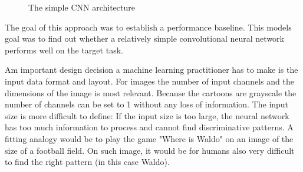 \documentclass[draft,final,oneside]{vutinfth} %
\begin{document}
\begin{figure}[ht]

	
	\caption{The simple CNN architecture}
	\label{fig:simplecnn}
\end{figure}

The goal of this approach was to establish a performance baseline. This models goal was to find out whether a relatively simple convolutional neural network performs well on the target task.

Am important design decision a machine learning practitioner has to make is the input data format and layout. For images the number of input channels and the dimensions of the image is most relevant. Because the cartoons are grayscale the number of channels can be set to 1 without any loss of information. The input size is more difficult to define: If the input size is too large, the neural network has too much information to process and cannot find discriminative patterns. A fitting analogy would be to play the game "Where is Waldo" on an image of the size of a football field. On such image, it would be for humans also very difficult to find the right pattern (in this case Waldo).
\end{document}
